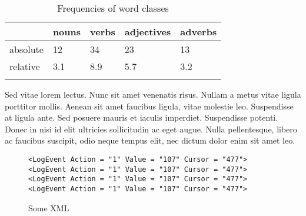 \begin{table}
\caption{Frequencies of word classes}
\label{tab:1:frequencies}
 \begin{tabular}{lllll} %
  \lsptoprule
            & nouns & verbs & adjectives & adverbs\\ %
  \midrule
  absolute  &   12 &    34  &    23     & 13\\
  relative  &   3.1 &   8.9 &    5.7    & 3.2\\
  \lspbottomrule
 \end{tabular}
\end{table}


Sed vitae lorem lectus. Nunc sit amet venenatis risus. Nullam a metus vitae ligula porttitor mollis. Aenean sit amet faucibus ligula, vitae molestie leo. Suspendisse at ligula ante. Sed posuere mauris et iaculis imperdiet. Suspendisse potenti. Donec in nisi id elit ultricies sollicitudin ac eget augue. Nulla pellentesque, libero ac faucibus suscipit, odio neque tempus elit, nec dictum dolor enim sit amet leo. 

\begin{figure}
\caption{Some XML}
\begin{verbatim}
<LogEvent Action = "1" Value = "107" Cursor = "477">
<LogEvent Action = "1" Value = "107" Cursor = "477">
<LogEvent Action = "1" Value = "107" Cursor = "477">
<LogEvent Action = "1" Value = "107" Cursor = "477">
\end{verbatim}
\end{figure}

\lipsum[1-130]
